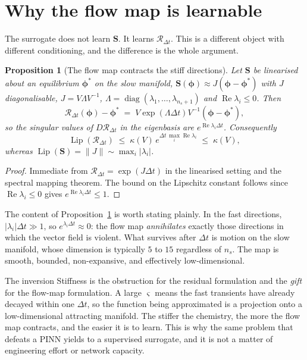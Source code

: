 \documentclass[11pt]{article}
\DeclareMathOperator{\diag}{diag}
\newcommand{\vv}[1]{\bm{#1}}
\newcommand{\phiv}{\vv{\phi}}
\newcommand{\Sv}{\vv{S}}
\newcommand{\Rmap}{\mathcal{R}}
\newcommand{\dt}{\Delta t}
\theoremstyle{plain}
\newtheorem{proposition}[theorem]{Proposition}
\theoremstyle{definition}
\begin{document}
\section{Why the flow map is learnable}

The surrogate does not learn $\Sv$. It learns $\Rmap_{\dt}$. This is a
different object with different conditioning, and the difference is the whole
argument.

\begin{proposition}[The flow map contracts the stiff directions]
\label{prop:contract}
Let $\Sv$ be linearised about an equilibrium $\phiv^\ast$ on the slow manifold,
$\Sv(\phiv)\approx J(\phiv-\phiv^\ast)$ with $J$ diagonalisable,
$J = V\Lambda V^{-1}$, $\Lambda=\diag(\lambda_1,\dots,\lambda_{n_s+1})$ and
$\operatorname{Re}\lambda_i \le 0$. Then
\begin{equation}
\Rmap_{\dt}(\phiv) - \phiv^\ast
  \;=\; V \exp(\Lambda \dt) V^{-1} (\phiv - \phiv^\ast),
\end{equation}
so the singular values of $D\Rmap_{\dt}$ in the eigenbasis are
$e^{\operatorname{Re}\lambda_i \dt}$. Consequently
\begin{equation}
\operatorname{Lip}(\Rmap_{\dt}) \;\le\; \kappa(V)\,
  e^{\dt\,\max_i \operatorname{Re}\lambda_i} \;\le\; \kappa(V),
\end{equation}
whereas $\operatorname{Lip}(\Sv) = \|J\| \sim \max_i|\lambda_i|$.
\end{proposition}

\begin{proof}
Immediate from $\Rmap_{\dt} = \exp(J\dt)$ in the linearised setting and the
spectral mapping theorem. The bound on the Lipschitz constant follows since
$\operatorname{Re}\lambda_i\le 0$ gives $e^{\operatorname{Re}\lambda_i\dt}\le 1$.
\end{proof}

The content of Proposition~\ref{prop:contract} is worth stating plainly. In the
fast directions, $|\lambda_i|\dt \gg 1$, so $e^{\lambda_i \dt}\approx 0$: the
flow map \emph{annihilates} exactly those directions in which the vector field
is violent. What survives after $\dt$ is motion on the slow manifold, whose
dimension is typically $5$ to $15$ regardless of $n_s$. The map is smooth,
bounded, non-expansive, and effectively low-dimensional.

\begin{engbox}{The inversion}
Stiffness is the obstruction for the residual formulation and the \emph{gift}
for the flow-map formulation. A large $\varsigma$ means the fast transients have
already decayed within one $\dt$, so the function being approximated is a
projection onto a low-dimensional attracting manifold. The stiffer the
chemistry, the more the flow map contracts, and the easier it is to learn. This
is why the same problem that defeats a PINN yields to a supervised surrogate,
and it is not a matter of engineering effort or network capacity.
\end{engbox}
\end{document}
